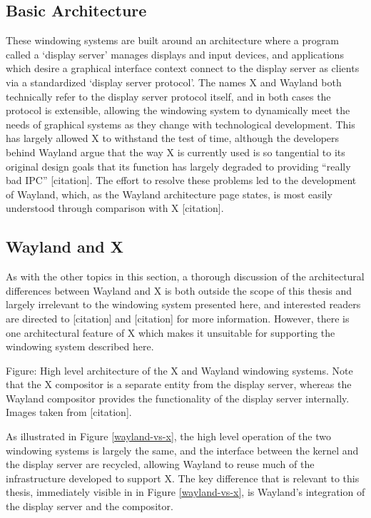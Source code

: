 \subsection{Basic Architecture}

These windowing systems are built around an architecture where a program called a ‘display server’ manages displays and input devices, and applications which desire a graphical interface context connect to the display server as clients via a standardized ‘display server protocol’. The names X and Wayland both technically refer to the display server protocol itself, and in both cases the protocol is extensible, allowing the windowing system to dynamically meet the needs of graphical systems as they change with technological development. This has largely allowed X to withstand the test of time, although the developers behind Wayland argue that the way X is currently used is so tangential to its original design goals that its function has largely degraded to providing “really bad IPC” [citation]. The effort to resolve these problems led to the development of Wayland, which, as the Wayland architecture page states, is most easily understood through comparison with X [citation].

\subsection{Wayland and X}

As with the other topics in this section, a thorough discussion of the architectural differences between Wayland and X is both outside the scope of this thesis and largely irrelevant to the windowing system presented here, and interested readers are directed to [citation] and [citation] for more information. However, there is one architectural feature of X which makes it unsuitable for supporting the windowing system described here.

Figure: High level architecture of the X and Wayland windowing systems. Note that the X compositor is a separate entity from the display server, whereas the Wayland compositor provides the functionality of the display server internally. Images taken from   [citation].

As illustrated in Figure \ref{wayland-vs-x}, the high level operation of the two windowing systems is largely the same, and the interface between the kernel and the display server are recycled, allowing Wayland to reuse much of the infrastructure developed to support X. The key difference that is relevant to this thesis, immediately visible in in Figure \ref{wayland-vs-x}, is Wayland’s integration of the display server and the compositor. 

